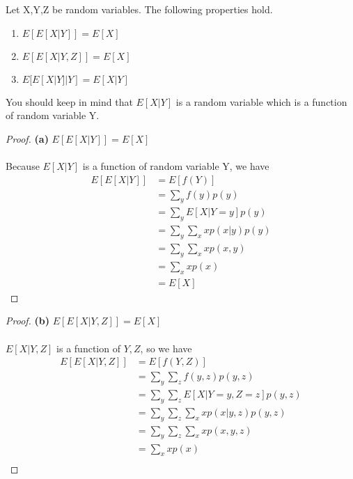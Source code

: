 \begin{enumerate}
\begin{lemma}{Let X,Y,Z be random variables. The following properties hold.}
\begin{enumerate}
              \item
                    $E[E[X|Y]]=E[X]$
              \item
                    $E[E[X|Y,Z]]=E[X]$
              \item
                    $E[E[X|Y]|Y]=E[X|Y]$

            \end{enumerate}

          \end{lemma}
          You should keep in mind that $E[X|Y]$ is a random variable which is a function of random variable Y.
          \begin{proof}{\textbf{(a)} $E[E[X|Y]]=E[X]$}
            \\ \\Because $E[X|Y]$ is a function of random variable Y, we have
            \begin{align*}
              E[E[X|Y]] & = E[f(Y)]                     \\
                        & = \sum_{y}f(y)p(y)            \\
                        & = \sum_{y}E[X|Y=y]p(y)        \\
                        & = \sum_{y}\sum_{x}xp(x|y)p(y) \\
                        & = \sum_{y}\sum_{x}xp(x,y)     \\
                        & = \sum_{x}xp(x)               \\
                        & = E[X]
            \end{align*}
          \end{proof}
          \begin{proof}{\textbf{(b)} $E[E[X|Y,Z]]=E[X]$}
            \\ \\$E[X|Y,Z]$ is a function of $Y,Z$, so we have
              \begin{align*}
                E[E[X|Y,Z]] & = E[f(Y,Z)]                               \\
                            & = \sum_{y}\sum_{z}f(y,z)p(y,z)            \\
                            & = \sum_{y}\sum_{z}E[X|Y=y,Z=z]p(y,z)      \\
                            & = \sum_{y}\sum_{z}\sum_{x}xp(x|y,z)p(y,z) \\
                            & = \sum_{y}\sum_{z}\sum_{x}xp(x,y,z)       \\
                            & = \sum_{x}xp(x)                           \\

\end{align*}
\end{proof}
\end{enumerate}
